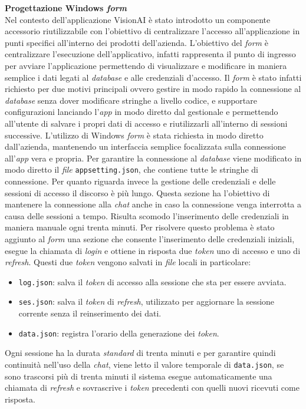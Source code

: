 \textbf{Progettazione Windows \textit{form}}\\
Nel contesto dell'applicazione VisionAI è stato introdotto un componente accessorio riutilizzabile con l'obiettivo di centralizzare l'accesso all'applicazione in punti specifici all'interno dei prodotti dell'azienda. 
L'obiettivo del \textit{form} è centralizzare l'esecuzione dell'applicativo, infatti rappresenta il punto di ingresso per avviare l'applicazione permettendo di visualizzare e modificare in maniera semplice i dati legati al \textit{database} e alle credenziali d'accesso. Il \textit{form} è stato infatti richiesto per due motivi principali ovvero gestire in modo rapido la connessione al \textit{database} senza dover modificare stringhe a livello codice, e supportare configurazioni lanciando l'\textit{app} in modo diretto dal gestionale e permettendo all'utente di salvare i propri dati di accesso e riutilizzarli all'interno di sessioni successive.
L'utilizzo di Windows \textit{form} è stata richiesta in modo diretto dall'azienda, mantenendo un interfaccia semplice focalizzata sulla  connessione all'\textit{app} vera e propria.
Per garantire la connessione al \textit{database} viene modificato in modo diretto il \textit{file} \texttt{appsetting.json}, che contiene tutte le stringhe di connessione.
Per quanto riguarda invece la gestione delle credenziali e delle sessioni di accesso il discorso è più lungo.
Questa sezione ha l'obiettivo di mantenere la connessione alla \textit{chat} anche in caso la connessione venga interrotta a causa delle sessioni a tempo. Risulta scomodo l'inserimento delle credenziali in maniera manuale ogni trenta minuti.
Per risolvere questo problema è stato aggiunto al \textit{form} una sezione che consente l'inserimento delle credenziali iniziali, esegue la chiamata di \textit{login} e ottiene in  risposta due \textit{token} uno di accesso e uno di \textit{refresh}. Questi due \textit{token} vengono salvati in \textit{file} locali in particolare: 
\begin{itemize}
    \item \texttt{log.json}: salva il \textit{token} di accesso alla sessione che sta per essere avviata.
    \item \texttt{ses.json}: salva il \textit{token} di \textit{refresh}, utilizzato per aggiornare la sessione corrente senza il reinserimento dei dati.
    \item \texttt{data.json}: registra l'orario della generazione dei \textit{token}.
\end{itemize}
Ogni sessione ha la durata \textit{standard} di trenta minuti e per garantire quindi continuità nell'uso della \textit{chat}, viene letto il valore temporale di \texttt{data.json}, se sono trascorsi più di trenta minuti il sistema esegue automaticamente una chiamata di \textit{refresh} e sovrascrive i \textit{token} precedenti con quelli nuovi ricevuti come risposta.

